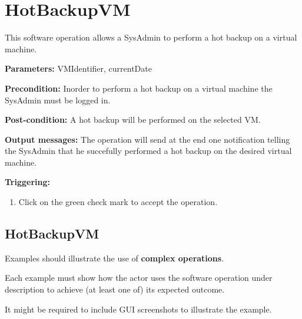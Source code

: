 \section{HotBackupVM}
\label{operation:HotBackupVM}
This software operation allows a SysAdmin to perform a hot backup on a virtual
machine.
\begin{description}

\item \textbf{Parameters:} VMIdentifier, currentDate
\item \textbf{Precondition:} Inorder to perform a hot backup on a virtual
machine the SysAdmin must be logged in.
\item \textbf{Post-condition:} A hot backup will be performed on the selected
VM.
\item \textbf{Output messages:} The operation will send at the end one
notification telling the SysAdmin that he succefully performed a hot backup on
the desired virtual machine.

\item \textbf{Triggering:}
\begin{enumerate}
\item Click on the green check mark to accept the operation.
\end{enumerate}

 
\end{description}

 
\subsection{HotBackupVM}
Examples should illustrate the use of \textbf{complex operations}.

Each example must show how the actor uses the software operation under
description to achieve (at least one of) its expected outcome.

It might be required to include GUI screenshots to illustrate the example.







